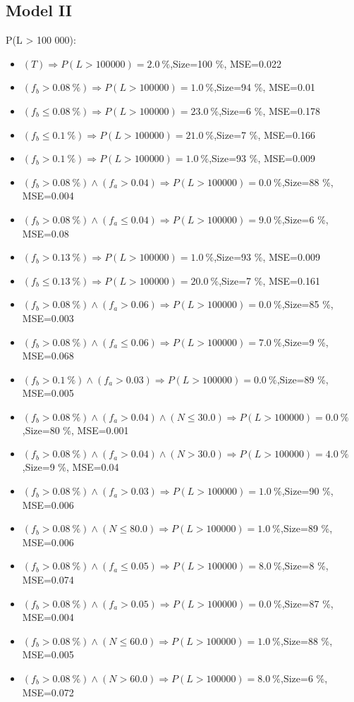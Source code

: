 \documentclass[numbered]{CSL}
\begin{document}
\subsection{Model II}
P(L > 100 000):
\begin{itemize}
\item $(T) \Rightarrow P(L > 100 000) = 2.0~\%$,\hfill Size=100 \%, MSE=0.022
\item $(f_b > 0.08~\%) \Rightarrow P(L > 100 000) = 1.0~\%$,\hfill Size=94 \%, MSE=0.01
\item $(f_b \leq 0.08~\%) \Rightarrow P(L > 100 000) = 23.0~\%$,\hfill Size=6 \%, MSE=0.178
\item $(f_b \leq 0.1~\%) \Rightarrow P(L > 100 000) = 21.0~\%$,\hfill Size=7 \%, MSE=0.166
\item $(f_b > 0.1~\%) \Rightarrow P(L > 100 000) = 1.0~\%$,\hfill Size=93 \%, MSE=0.009
\item $(f_b > 0.08~\%) \land (f_a > 0.04) \Rightarrow P(L > 100 000) = 0.0~\%$,\hfill Size=88 \%, MSE=0.004
\item $(f_b > 0.08~\%) \land (f_a \leq 0.04) \Rightarrow P(L > 100 000) = 9.0~\%$,\hfill Size=6 \%, MSE=0.08
\item $(f_b > 0.13~\%) \Rightarrow P(L > 100 000) = 1.0~\%$,\hfill Size=93 \%, MSE=0.009
\item $(f_b \leq 0.13~\%) \Rightarrow P(L > 100 000) = 20.0~\%$,\hfill Size=7 \%, MSE=0.161
\item $(f_b > 0.08~\%) \land (f_a > 0.06) \Rightarrow P(L > 100 000) = 0.0~\%$,\hfill Size=85 \%, MSE=0.003
\item $(f_b > 0.08~\%) \land (f_a \leq 0.06) \Rightarrow P(L > 100 000) = 7.0~\%$,\hfill Size=9 \%, MSE=0.068
\item $(f_b > 0.1~\%) \land (f_a > 0.03) \Rightarrow P(L > 100 000) = 0.0~\%$,\hfill Size=89 \%, MSE=0.005
\item $(f_b > 0.08~\%) \land (f_a > 0.04) \land (N \leq 30.0) \Rightarrow P(L > 100 000) = 0.0~\%$,\hfill Size=80 \%, MSE=0.001
\item $(f_b > 0.08~\%) \land (f_a > 0.04) \land (N > 30.0) \Rightarrow P(L > 100 000) = 4.0~\%$,\hfill Size=9 \%, MSE=0.04
\item $(f_b > 0.08~\%) \land (f_a > 0.03) \Rightarrow P(L > 100 000) = 1.0~\%$,\hfill Size=90 \%, MSE=0.006
\item $(f_b > 0.08~\%) \land (N \leq 80.0) \Rightarrow P(L > 100 000) = 1.0~\%$,\hfill Size=89 \%, MSE=0.006
\item $(f_b > 0.08~\%) \land (f_a \leq 0.05) \Rightarrow P(L > 100 000) = 8.0~\%$,\hfill Size=8 \%, MSE=0.074
\item $(f_b > 0.08~\%) \land (f_a > 0.05) \Rightarrow P(L > 100 000) = 0.0~\%$,\hfill Size=87 \%, MSE=0.004
\item $(f_b > 0.08~\%) \land (N \leq 60.0) \Rightarrow P(L > 100 000) = 1.0~\%$,\hfill Size=88 \%, MSE=0.005
\item $(f_b > 0.08~\%) \land (N > 60.0) \Rightarrow P(L > 100 000) = 8.0~\%$,\hfill Size=6 \%, MSE=0.072
\end{itemize}
\end{document}
